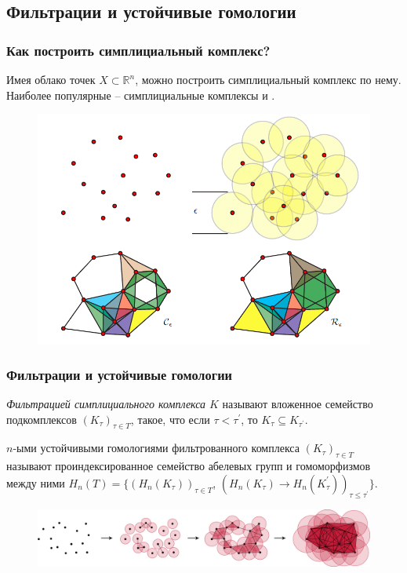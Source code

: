 \documentclass{beamer}
\begin{document}
		\subsection{Фильтрации и устойчивые гомологии}
		\begin{frame}
			\frametitle{Как построить симплициальный комплекс?}
			
			Имея облако точек $X \subset \mathbb{R}^n$, можно построить симплициальный комплекс по нему.  Наиболее популярные -- симплициальные комплексы  и .
			\begin{figure}
				\centering
				\includegraphics[scale=0.3]{complexes.png}
			\end{figure}
		\end{frame}
		\begin{frame}
			\frametitle{Фильтрации и устойчивые гомологии}
			{\it Фильтрацией симплициального комплекса $K$} называют вложенное семейство подкомплексов $ (K_\tau)_{\tau \in T} $, такое, что если $ \tau < \tau^{'} $, то $ K_\tau \subseteq K_{\tau^{'}} $.
			\begin{definition}
				$n$-ыми устойчивыми гомологиями фильтрованного комплекса $ (K_\tau)_{\tau \in T} $ называют проиндексированное семейство абелевых групп и гомоморфизмов между ними $H_n(T) = \{ (H_n(K_\tau))_{\tau \in T} $, $ (H_n(K_\tau) \to H_n(K_\tau^{'}))_{\tau \leq \tau^{'}} \}$.
			\end{definition}
			\begin{figure}
				\centering
				\includegraphics[width=\linewidth]{filtration.png}
			\end{figure}
		\end{frame}
\end{document}
